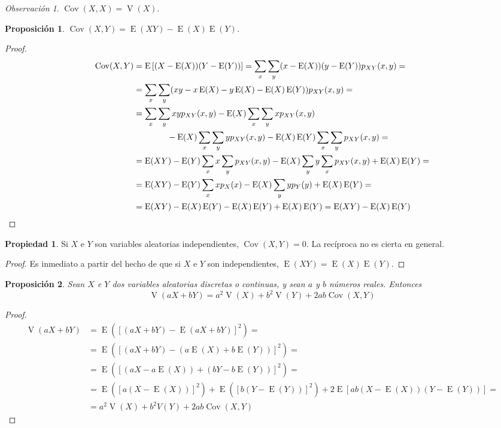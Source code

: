 \documentclass[11pt]{article}
\theoremstyle{plain}
\newtheorem*{pro}{Proposición}
\theoremstyle{definition}
\newtheorem*{prop}{Propiedad}
\theoremstyle{remark}
\newtheorem*{obs}{Observación}
\newcommand{\esp}[0]{\ensuremath{\operatorname{E}}}  %
\newcommand{\var}[0]{\ensuremath{\operatorname{V}}}  %
\newcommand{\cov}[0]{\ensuremath{\operatorname{Cov}}}  %
\begin{document}
      \begin{obs}
        $\cov(X,X) = \var(X)$.
      \end{obs}

      \begin{pro}
        $\cov(X,Y) = \esp(XY) - \esp(X) \esp(Y)$.
      \end{pro}
      \begin{proof}
        \[ \begin{split}
          \cov(X,Y) &= \esp\left[ (X - \esp(X)) (Y - \esp(Y)) \right] = \sum_x \sum_y (x - \esp(X)) (y - \esp(Y)) p_{XY}(x,y) = \\
          &= \sum_x \sum_y (xy - x \esp(X) - y \esp(X) - \esp(X) \esp(Y)) p_{XY}(x,y) = \\
          &= \sum_x \sum_y xy p_{XY}(x,y) - \esp(X) \sum_x \sum_y x p_{XY}(x,y) \\
          &\qquad \qquad - \esp(X) \sum_x \sum_y y p_{XY}(x,y) - \esp(X) \esp(Y) \sum_x \sum_y p_{XY}(x,y) = \\
          &= \esp(XY) - \esp(Y) \sum_x x \sum_y p_{XY}(x,y) - \esp(X) \sum_y y \sum_x p_{XY}(x,y) + \esp(X) \esp(Y) = \\
          &= \esp(XY) - \esp(Y) \sum_x x p_X(x) - \esp(X) \sum_y y p_Y(y) + \esp(X) \esp(Y) = \\
          &= \esp(XY) - \esp(X) \esp(Y) - \esp(X) \esp(Y) + \esp(X) \esp(Y) = \esp(XY) - \esp(X) \esp(Y) \qedhere
        \end{split} \]
      \end{proof}

      \begin{prop}
        Si $X$ e $Y$ son variables aleatorias independientes, $\cov(X,Y) = 0$. La recíproca no es cierta en general.
      \end{prop}
      \begin{proof}
        Es inmediato a partir del hecho de que si $X$ e $Y$ son independientes, $\esp(XY) = \esp(X) \esp(Y)$.
      \end{proof}

      \begin{pro}
        Sean $X$ e $Y$ dos variables aleatorias discretas o continuas, y sean $a$ y $b$ números reales. Entonces
        \[ \var(aX + bY) = a^2 \var(X) + b^2 \var(Y) + 2ab \cov(X,Y) \]
      \end{pro}
      \begin{proof}
        \[ \begin{split}
          \var(aX + bY) &= \esp \left( [(aX + bY) - \esp(aX + bY)]^2 \right) = \\
          &= \esp \left( [(aX + bY) - (a \esp(X) + b \esp(Y))]^2 \right) = \\
          &= \esp \left( [(aX - a \esp(X)) + (bY - b\esp(Y))]^2 \right) = \\
          &= \esp \left( [a (X - \esp(X))]^2 \right) + \esp \left( [b (Y - \esp(Y))]^2 \right) + 2 \esp[ab (X - \esp(X)) (Y - \esp(Y))] = \\
          &= a^2 \var(X) + b^2 V(Y) + 2 ab \cov(X,Y)
        \end{split} \]
      \end{proof}
\end{document}
